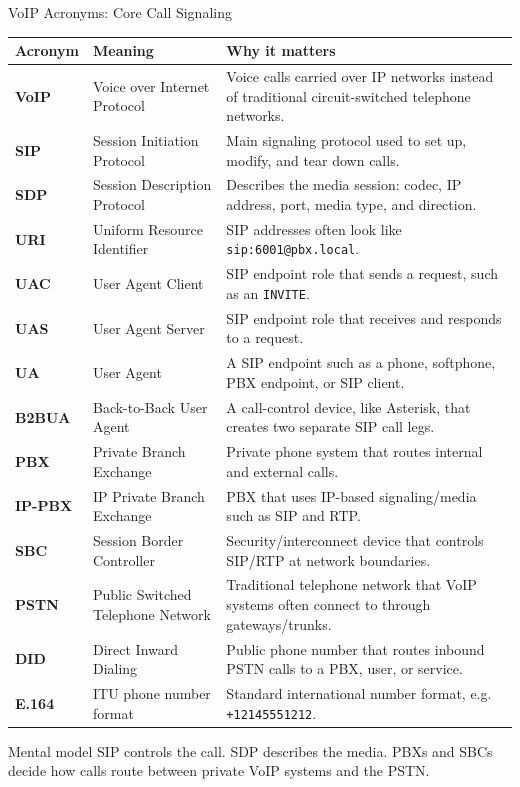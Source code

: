 \documentclass[aspectratio=169]{beamer}
\begin{document}

\begin{frame}{VoIP Acronyms: Core Call Signaling}
\tiny

\begin{tabular}{p{1.7cm} p{3.3cm} p{7.0cm}}
\toprule
\textbf{Acronym} & \textbf{Meaning} & \textbf{Why it matters} \\
\midrule
\textbf{VoIP} & Voice over Internet Protocol & Voice calls carried over IP networks instead of traditional circuit-switched telephone networks. \\
\textbf{SIP} & Session Initiation Protocol & Main signaling protocol used to set up, modify, and tear down calls. \\
\textbf{SDP} & Session Description Protocol & Describes the media session: codec, IP address, port, media type, and direction. \\
\textbf{URI} & Uniform Resource Identifier & SIP addresses often look like \texttt{sip:6001@pbx.local}. \\
\textbf{UAC} & User Agent Client & SIP endpoint role that sends a request, such as an \texttt{INVITE}. \\
\textbf{UAS} & User Agent Server & SIP endpoint role that receives and responds to a request. \\
\textbf{UA} & User Agent & A SIP endpoint such as a phone, softphone, PBX endpoint, or SIP client. \\
\textbf{B2BUA} & Back-to-Back User Agent & A call-control device, like Asterisk, that creates two separate SIP call legs. \\
\textbf{PBX} & Private Branch Exchange & Private phone system that routes internal and external calls. \\
\textbf{IP-PBX} & IP Private Branch Exchange & PBX that uses IP-based signaling/media such as SIP and RTP. \\
\textbf{SBC} & Session Border Controller & Security/interconnect device that controls SIP/RTP at network boundaries. \\
\textbf{PSTN} & Public Switched Telephone Network & Traditional telephone network that VoIP systems often connect to through gateways/trunks. \\
\textbf{DID} & Direct Inward Dialing & Public phone number that routes inbound PSTN calls to a PBX, user, or service. \\
\textbf{E.164} & ITU phone number format & Standard international number format, e.g. \texttt{+12145551212}. \\
\bottomrule
\end{tabular}

\vspace{0.15cm}

\begin{block}{Mental model}
SIP controls the call. SDP describes the media. PBXs and SBCs decide how calls route between private VoIP systems and the PSTN.
\end{block}

\end{frame}
\end{document}
